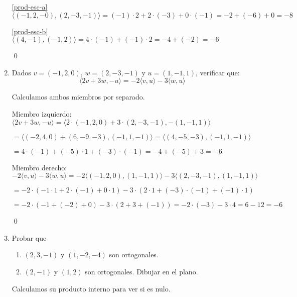 \begin{enumerate}[topsep=6pt, itemsep=.4cm]
\rta


\noindent\ref{prod-esc-a} $\langle (-1, 2, -0) ,(2,-3,-1) \rangle = (-1) \cdot 2 + 2 \cdot (-3) + 0 \cdot (-1) = -2 + (-6) + 0 = \boxed{-8}$ 

\noindent\ref{prod-esc-b}  $\langle (4,-1),(-1,2) \rangle = 4 \cdot (-1) + (-1) \cdot 2 = -4 + (-2) = \boxed{-6}$

\qed

\item Dados $v = (-1, 2,0)$, $w = (2,-3,-1)$  y $u = (1,-1,1)$, verificar que:
\begin{equation*}
    \langle 2v + 3w , -u   \rangle = -2\langle v ,u \rangle -3 \langle w , u  \rangle
\end{equation*}

\rta Calculamos ambos miembros por separado.


Miembro izquierdo: $\langle 2v + 3w , -u   \rangle = \langle 2 \cdot (-1, 2,0) + 3 \cdot (2,-3,-1) , -  (1,-1,1) \rangle $

$= \langle (-2, 4,0) + (6,-9,-3) , (-1,1,-1) \rangle = \langle (4,-5,-3) , (-1,1,-1) \rangle $

$= 4 \cdot (-1) + (-5) \cdot 1 + (-3) \cdot (-1) = -4 + (-5) + 3 = \boxed{-6}$

Miembro derecho: $-2\langle v ,u \rangle -3 \langle w , u  \rangle = -2 \langle (-1, 2,0) ,(1,-1,1) \rangle -3 \langle (2,-3,-1) , (1,-1,1)  \rangle $

$= -2 \cdot ( -1 \cdot 1 + 2 \cdot (-1) + 0 \cdot 1 ) - 3 \cdot ( 2 \cdot 1 + (-3) \cdot (-1) + (-1) \cdot 1 ) $

$= -2 \cdot ( -1 + (-2) + 0) - 3 \cdot ( 2 + 3 + (-1)) = -2 \cdot (-3) - 3 \cdot  4 = 6 - 12 = \boxed{-6} $

\qed

\item Probar  que 
\begin{enumerate}
    \item\label{otrogonales-a} $(2,3,-1)$ y $(1, -2, -4)$ son ortogonales.
    \item\label{otrogonales-b} $(2,-1)$ y $(1,2)$ son ortogonales. Dibujar en el plano. 
\end{enumerate}

\rta Calculamos su producto interno para ver si es nulo.



\end{enumerate}
